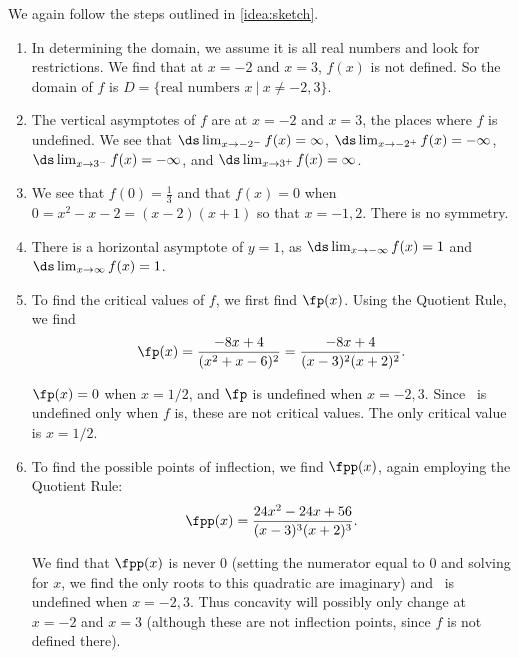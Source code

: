 {We again follow the steps outlined in \autoref{idea:sketch}.

\begin{enumerate}
	\item	In determining the domain, we assume it is all real numbers and look for restrictions. We find that at $x=-2$ and $x=3$, $f(x)$ is not defined. So the domain of $f$ is $D = \{\text{real numbers } x\ \vert \ x\neq -2,3\}$.
		
	\item	The vertical asymptotes of $f$ are at $x=-2$ and $x=3$, the places where $f$ is undefined.  We see that $\ds\lim_{x\to-2^-}f(x)=\infty$, $\ds\lim_{x\to-2^+}f(x)=-\infty$, $\ds\lim_{x\to3^-}f(x)=-\infty$, and $\ds\lim_{x\to3^+}f(x)=\infty$.
		
	\item	We see that $f(0)=\frac13$ and that $f(x)=0$ when $0=x^2-x-2=(x-2)(x+1)$ so that $x=-1,2$.  There is no symmetry.

	\item	There is a horizontal asymptote of $y=1$, as $\ds \lim_{x\to -\infty}f(x) = 1$ and $\ds\lim_{x\to\infty}f(x) =1$.
		
	\item	To find the critical values of $f$, we first find $\fp(x)$. Using the Quotient Rule, we find $$\fp(x) = \frac{-8x+4}{(x^2+x-6)^2} = \frac{-8x+4}{(x-3)^2(x+2)^2}.$$
		
	$\fp(x) = 0$ when $x = 1/2$, and $\fp$ is undefined when $x=-2,3$. Since \fp\ is undefined only when $f$ is, these are not critical values. The only critical value is $x=1/2$.
		
	\item	To find the possible points of inflection, we find $\fpp(x)$, again employing the Quotient Rule: $$\fpp(x) = \frac{24x^2-24x+56}{(x-3)^3(x+2)^3}.$$
		
	We find that $\fpp(x)$ is never 0 (setting the numerator equal to 0 and solving for $x$, we find the only roots to this quadratic are imaginary) and \fpp\ is undefined when $x=-2,3$. Thus concavity will possibly only change at $x=-2$ and $x=3$ (although these are not inflection points, since $f$ is not defined there).
		


\end{enumerate}}
